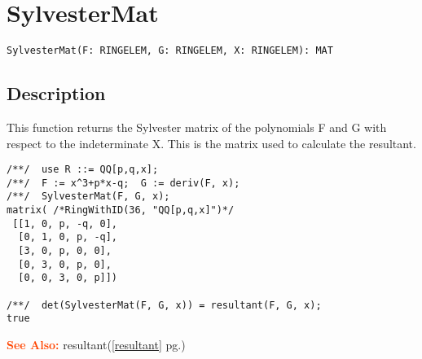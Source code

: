 \documentclass[a4paper]{mybook}
\newenvironment{command}{}{} %
\newcommand\SeeAlso{\par\textcolor{OrangeRed}{\textbf{\large See Also: }}}
\begin{document}
\section{SylvesterMat}
\label{SylvesterMat}
\begin{command} %


\begin{Verbatim}[label=syntax, rulecolor=\color{MidnightBlue},
frame=single]
SylvesterMat(F: RINGELEM, G: RINGELEM, X: RINGELEM): MAT
\end{Verbatim}


\subsection*{Description}

This function returns the Sylvester matrix of the polynomials F and G
with respect to the indeterminate X.  This is the matrix used to
calculate the resultant.
\begin{Verbatim}[label=example, rulecolor=\color{PineGreen}, frame=single]
/**/  use R ::= QQ[p,q,x];
/**/  F := x^3+p*x-q;  G := deriv(F, x);
/**/  SylvesterMat(F, G, x);
matrix( /*RingWithID(36, "QQ[p,q,x]")*/
 [[1, 0, p, -q, 0],
  [0, 1, 0, p, -q],
  [3, 0, p, 0, 0],
  [0, 3, 0, p, 0],
  [0, 0, 3, 0, p]])

/**/  det(SylvesterMat(F, G, x)) = resultant(F, G, x);
true
\end{Verbatim}


\SeeAlso %
  resultant(\ref{resultant} pg.\pageref{resultant})
\end{command} %
\end{document}
